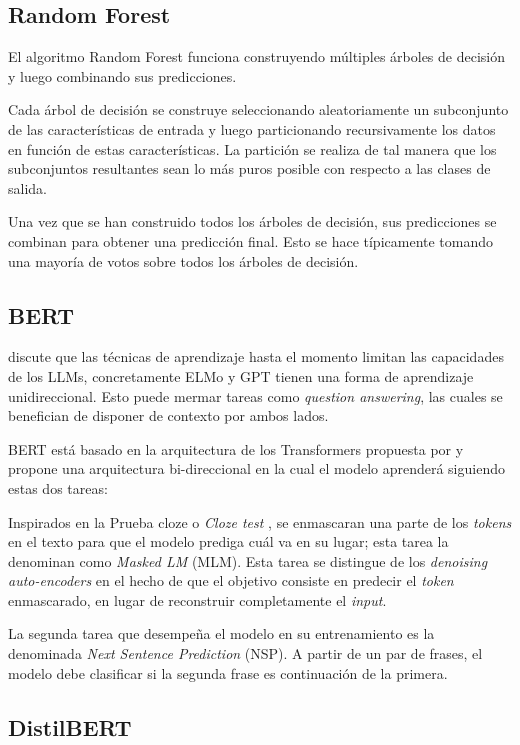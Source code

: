 \subsection{Random Forest}

El algoritmo Random Forest funciona construyendo múltiples árboles de decisión y luego combinando sus predicciones.

Cada árbol de decisión se construye seleccionando aleatoriamente un subconjunto de las características de entrada y luego particionando recursivamente los datos en función de estas características. La partición se realiza de tal manera que los subconjuntos resultantes sean lo más puros posible con respecto a las clases de salida.

Una vez que se han construido todos los árboles de decisión, sus predicciones se combinan para obtener una predicción final. Esto se hace típicamente tomando una mayoría de votos sobre todos los árboles de decisión.

\subsection{BERT}

\citet{Devlin2018} discute que las técnicas de aprendizaje hasta el momento limitan las capacidades de los LLMs, concretamente ELMo \citep{Peters2018} y GPT \citep{Radford2018} tienen una forma de aprendizaje unidireccional. Esto puede mermar tareas como \emph{question answering}, las cuales se benefician de disponer de contexto por ambos lados.

BERT está basado en la arquitectura de los Transformers propuesta por \citet{Vaswani2017} y propone una arquitectura bi-direccional en la cual el modelo aprenderá siguiendo estas dos tareas:

Inspirados en la Prueba cloze o \emph{Cloze test} \citep{Taylor1953}, se enmascaran una parte de los \emph{tokens} en el texto para que el modelo prediga cuál va en su lugar; esta tarea la denominan como \emph{Masked LM} (MLM). Esta tarea se distingue de los \emph{denoising auto-encoders} en el hecho de que el objetivo consiste en predecir el \emph{token} enmascarado, en lugar de reconstruir completamente el \emph{input}.

La segunda tarea que desempeña el modelo en su entrenamiento es la denominada \emph{Next Sentence Prediction} (NSP). A partir de un par de frases, el modelo debe clasificar si la segunda frase es continuación de la primera.

\subsection{DistilBERT}

